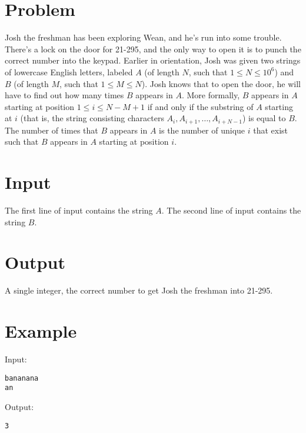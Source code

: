 \documentclass[11pt]{article}
\begin{document}
\section*{Problem}
Josh the freshman has been exploring Wean, and he's run into some trouble.
There's a lock on the door for 21-295, and the only way to open it is to punch the correct number into the keypad.
Earlier in orientation, Josh was given two strings of lowercase English letters, labeled $A$ (of length $N$, such that $1 \le N \le 10^6$) and $B$ (of length $M$, such that $1 \le M \le N$).
Josh knows that to open the door, he will have to find out how many times $B$ appears in $A$.
\linebreak
\linebreak
\noindent More formally, $B$ appears in $A$ starting at position $1 \le i \le N-M+1$ if and only if the substring of $A$ starting at $i$ (that is, the string consisting characters $A_i, A_{i+1}, \hdots, A_{i+N-1}$) is equal to $B$.
The number of times that $B$ appears in $A$ is the number of unique $i$ that exist such that $B$ appears in $A$ starting at position $i$.
\section*{Input}
The first line of input contains the string $A$.
The second line of input contains the string $B$.
\section*{Output}
A single integer, the correct number to get Josh the freshman into 21-295.
\section*{Example}
Input:

\begin{verbatim}
bananana
an
\end{verbatim}

\noindent Output:

\begin{verbatim}
3
\end{verbatim}
\end{document}
